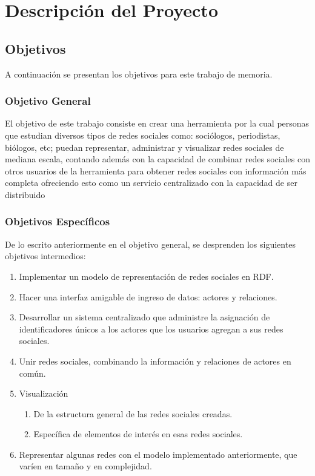 \chapter{Descripción del Proyecto}
\label{chap:descripcion_proyecto}

\section{Objetivos} %
\label{sec:objetivos}
A continuación se presentan los objetivos para este trabajo de memoria.

\subsection{Objetivo General} %
\label{sub:objetivo_general}

El objetivo de este trabajo consiste en crear una herramienta por la cual personas que estudian diversos tipos de redes
sociales como: sociólogos, periodistas, biólogos, etc; puedan representar, administrar y visualizar redes sociales
de mediana escala, contando además con la capacidad de combinar redes sociales con otros usuarios de la herramienta
para obtener redes sociales con información más completa ofreciendo esto como un servicio centralizado con la
capacidad de ser distribuido


\subsection{Objetivos Específicos} %
\label{sub:objetivos_especificos}

De lo escrito anteriormente en el objetivo general, se desprenden los siguientes objetivos intermedios:

  \begin{enumerate}
    \item Implementar un modelo de representación de redes sociales en RDF.
    \item Hacer una interfaz amigable de ingreso de datos: actores y relaciones.
    \item Desarrollar un sistema centralizado que administre la asignación de identificadores únicos a los actores que los usuarios agregan a sus redes sociales.
    \item Unir redes sociales, combinando la información y relaciones de actores en común.
    \item Visualización
      \begin{enumerate}
        \item De la estructura general de las redes sociales creadas.
        \item Específica de elementos de interés en esas redes sociales.
      \end{enumerate}
    \item Representar algunas redes con el modelo implementado anteriormente, que varíen en tamaño y en complejidad.
  \end{enumerate}


